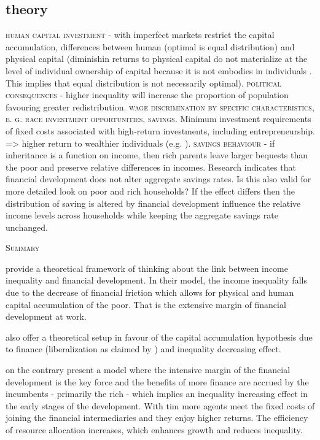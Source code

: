 \documentclass[a4paper,11pt]{article}
\begin{document}
\subsection{theory}
\textsc{human capital investment} - with imperfect markets restrict the capital accumulation, differences between human (optimal is equal distribution) and physical capital (diminishin returns to physical capital do not materialize at the level of individual ownership of capital because it is not embodies in individuals \cite{demirgucc2009finance}. This implies that equal distribution is not necessarily optimal). \textsc{political consequences} - higher inequality will increase the proportion of population favouring greater redistribution.  \textsc{wage discrimination by specific characteristics, e. g. race}
%
\textsc{investment opportunities, savings}. Minimum investment requirements of fixed costs associated with high-return investments, including entrepreneurship. => higher return to wealthier individuals (e.g. \citet{AtjeJovanovich1993,demel2008qje}).
\textsc{savings behaviour} - if inheritance is a function on income, then rich parents leave larger bequests than the poor and preserve relative differences in incomes. Research indicates that financial development does not alter aggregate savings rates. Is this also valid for more detailed look on poor and rich households? If the effect differs then the distribution of saving is altered by financial development influence the relative income levels across households while keeping the aggregate savings rate unchanged.

\textsc{Summary} 

\citet{galormoav2004} provide a theoretical framework of thinking about the link between income inequality and financial development. In their model, the income inequality falls due to the decrease of financial friction which allows for physical and human capital accumulation of the poor. That is the extensive margin of financial development at work.

\citet{banerjeenewman1990} also offer a theoretical setup in favour of the capital accumulation hypothesis due to finance (liberalization as claimed by \citet{de2017finance}) and inequality decreasing effect.

\citet{GreenwoodJovanovic1990} on the contrary present a model where the intensive margin of the financial development is the key force and the benefits of more finance are accrued by the incumbents - primarily the rich - which implies an inequality increasing effect in the early stages of the development. With tim more agents meet the fixed costs of joining the financial intermediaries and they enjoy higher returns. The efficiency of resource allocation increases, which enhances growth and reduces inequality.
\end{document}
